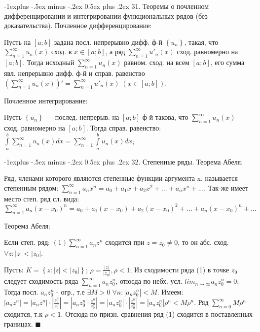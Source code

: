 \documentclass[unicode,10pt, landscape]{article}
\makeatletter
\renewcommand{\subsection}{\@startsection{subsection}{2}{0mm}%
                                {-1explus -.5ex minus -.2ex}%
                                {0.5ex plus .2ex}%
                                {\normalfont\normalsize\bfseries}}
\newenvironment{Proof} %
{\par\noindent{\bf Док-во:}} %
{\hfill$\scriptstyle\blacksquare$}
\makeatother
\begin{document}
\begin{multicols}{4}
 \subsection{31. Теоремы о почленном дифференцировании и интегрировании функциональных рядов (без доказательства).}
 Почленное дифференцирование:
 \begin{Th}
  Пусть на $\left[a;b\right]$ задана посл. непрерывно дифф. ф-й $\left \{ u_{n} \right \}$, такая, что $\sum_{n=1}^{\infty }u_{n}(x)$ сход. в $x\in \left[a;b\right]$, а ряд $\sum_{n=1}^{\infty }u'_{n}(x)$ сход.  равномерно на $\left[a;b\right]$. Тогда исходный $\sum_{n=1}^{\infty }u_{n}(x)$ равном. сход. на всем $\left[a;b\right]$, его сумма явл. непрерывно дифф. ф-й и справ. равенство $\left ( \sum_{n=1}^{\infty }u_{n}(x) \right )'=\sum_{n=1}^{\infty }u'_{n}(x)\; (x\in \left[a;b\right])$.
 \end{Th}
 Почленное интегрирование:
 \begin{Th}
  Пусть $\left \{ u_{n} \right \}$ — послед. непрерыв. на $\left[a;b\right]$ ф-й такова, что $\sum_{n=1}^{\infty }u_{n}(x)$ сход. равномерно на $\left[a;b\right]$. Тогда справ. равенство: $\int\limits_{a}^{b}\sum_{n=1}^{\infty }u_{n}(x)dx=\sum_{n=1}^{\infty }\int\limits_{a}^{b}u_{n}(x)dx$;
 \end{Th}
 \subsection{32. Степенные ряды. Теорема Абеля.}
 \begin{Def}
  Ряд, членами которого являются степенные функции аргумента x, называется степенным рядом: ${\sum_{n = 1}^\infty  {{a_n}{x^n}}  } = {{a_0} + {a_1}x + {a_2}{x^2} +  \ldots  + {a_n}{x^n} +  \ldots }$. Так-же имеет место степ. ряд сл. вида: ${\sum_{n = 1}^\infty  {{a_n}{{\left( {x - {x_0}} \right)}^n}}  } = {{a_0} + {a_1}\left( {x - {x_0}} \right) + {a_2}{\left( {x - {x_0}} \right)^2} } + { \ldots  + {a_n}{\left( {x - {x_0}} \right)^n} +  \ldots}$
 \end{Def}
 Теорема Абеля:
 \begin{Th}
  Если степ. ряд: $(1)\sum_{n=1}^\infty a_nz^n$ сходится при $z=z_0\neq0$, то он абс. сход. $\forall z: |z| < |z_0|$.
  \begin{Proof}
   Пусть: $K=\left\{z:\left|z\right|<\left|z_{0}\right|\right\}$; $\rho=\frac{\left|z \right|}{\left|z_{0} \right|}, \rho < 1$; Из сходимости ряда (1) в точке $z_0$ следует сходимость ряда $\sum_{n=1}^\infty a_nz_0^n$, отюсда по небх. усл. $lim_{n\to \infty}a_nz_0^n = 0$; Тогда посл. $a_nz_0^n$ - огр., т.е $\exists M>0\; \forall n:\left|a_{n}z_{0}^{n}\right|< M$. Имеем: $\left|a_{n}z^{n}\right|=\left|a_{n}z^{n}\right|\cdot \left|\frac{z_{0}^{n}}{z_{0}^{n}}\right|=\left|a_{n}z_{0}^{n}\cdot\frac{z^{n}}{z_{0}^{n}}\right|=\left|a_{n}z_{0}^{n}\right|\cdot\left|\frac{z^{n}}{z_{0}^{n}}\right|=\left|a_{n}z_{0}^{n}\right|\rho^{n} < M\rho^{n}$. Ряд $\sum_{n=0}^{\infty}M\rho^{n}$ сходится, т.к $\rho < 1$. Отсюда по призн. сравнения ряд (1) сходится в поставленных границах.
  \end{Proof}
 \end{Th}

\end{multicols}
\end{document}
